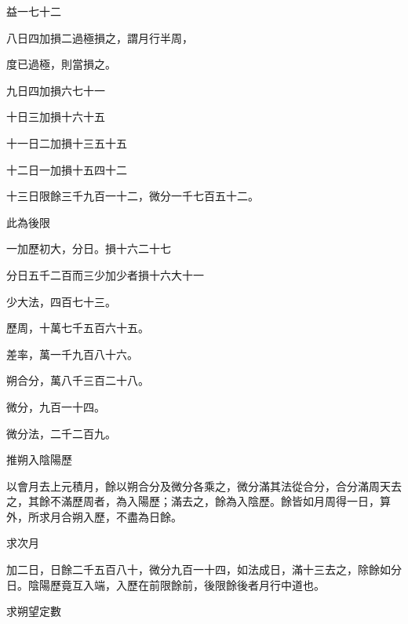 \begin{pinyinscope}
 益一七十二



 八日四加損二過極損之，謂月行半周，



 度已過極，則當損之。



 九日四加損六七十一



 十日三加損十六十五



 十一日二加損十三五十五



 十二日一加損十五四十二



 十三日限餘三千九百一十二，微分一千七百五十二。



 此為後限



 一加歷初大，分日。損十六二十七



 分日五千二百而三少加少者損十六大十一



 少大法，四百七十三。



 歷周，十萬七千五百六十五。



 差率，萬一千九百八十六。



 朔合分，萬八千三百二十八。



 微分，九百一十四。



 微分法，二千二百九。



 推朔入陰陽歷



 以會月去上元積月，餘以朔合分及微分各乘之，微分滿其法從合分，合分滿周天去之，其餘不滿歷周者，為入陽歷；滿去之，餘為入陰歷。餘皆如月周得一日，算外，所求月合朔入歷，不盡為日餘。



 求次月



 加二日，日餘二千五百八十，微分九百一十四，如法成日，滿十三去之，除餘如分日。陰陽歷竟互入端，入歷在前限餘前，後限餘後者月行中道也。



 求朔望定數




\end{pinyinscope}
